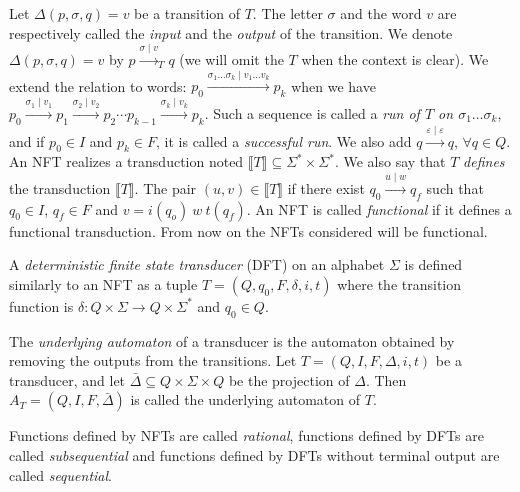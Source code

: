 \documentclass[12pt]{report}
\theoremstyle{definition}
\theoremstyle{remark}
\begin{document}
Let $\Delta (p,\sigma,q)=v$ be a transition of $T$. The letter $\sigma$ and the word $v$ are respectively called the \emph{input} and the \emph{output} of the transition.
We denote $\Delta (p,\sigma,q)=v$ by $p\xrightarrow{\sigma\mid v}_T q$ (we will omit the $T$ when the context is clear).
We extend the relation to words: $p_0\xrightarrow{\sigma_1\ldots\sigma_k\mid v_1\ldots v_k} p_k$ when we have $p_0\xrightarrow{\sigma_1\mid v_1} p_1\xrightarrow{\sigma_2\mid v_2} p_2\cdots p_{k-1}\xrightarrow{\sigma_k\mid v_k} p_k$. Such a sequence is called a \emph{run of $T$ on $\sigma_1\ldots\sigma_k$}, and if $p_0\in I$ and $p_k\in F$, it is called a \emph{successful run}. We also add $q\xrightarrow {\varepsilon\mid \varepsilon} q$, $\forall q\in Q$.
An NFT realizes a transduction noted $\llbracket T \rrbracket\subseteq \Sigma^\ast \times \Sigma^\ast$. We also say that $T$ \emph{defines} the transduction $\llbracket T \rrbracket$.
The pair $(u,v)\in \llbracket T \rrbracket$ if there exist $q_0\xrightarrow{u\mid w}q_f$ such that $q_0\in I$, $q_f\in F$ and $v=i(q_o)\ w\ t(q_f)$.
An NFT is called \emph{functional} if it defines a functional transduction.
From now on the NFTs considered will be functional.

A \emph{deterministic finite state transducer} (DFT) on an alphabet $\Sigma$ is defined similarly to an NFT as a tuple $T=(Q,q_0,F,\delta,i,t)$ 
where the transition function is $\delta: Q\times\Sigma\rightarrow Q\times \Sigma^\ast$ and $q_0\in Q$.

The \emph{underlying automaton} of a transducer is the automaton obtained by removing the outputs from the transitions.
Let $T=(Q,I,F,\Delta,i,t)$ be a transducer, and let $\bar{\Delta}\subseteq Q\times \Sigma\times Q$ be the projection of $\Delta$. Then $A_T=(Q,I,F,\bar\Delta)$ is called the underlying automaton of $T$.

Functions defined by NFTs are called \emph{rational}, functions defined by DFTs are called \emph{subsequential} and functions defined by DFTs without terminal output are called \emph{sequential}.
\end{document}
